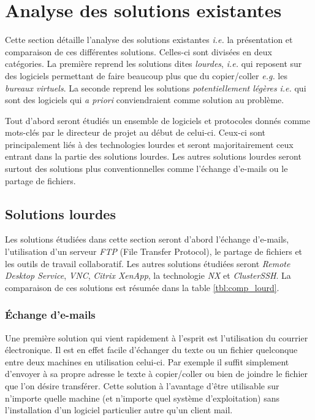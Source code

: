 \chapter{Analyse des solutions existantes}
\renewcommand{\leftmark}{\thechapter.~~Analyse des solutions existantes}
Cette section détaille l'analyse des solutions existantes
\emph{i.e.} la présentation
et comparaison de ces différentes solutions. Celles-ci sont divisées en
deux catégories. La première reprend les solutions dites \emph{lourdes},
\emph{i.e.} qui reposent sur des logiciels permettant de faire
beaucoup plus que du copier/coller \emph{e.g.} les \emph{bureaux virtuels}.
La seconde reprend les solutions \emph{potentiellement légères} \emph{i.e.}
qui sont des logiciels qui \emph{a priori} conviendraient comme solution
au problème.

Tout d'abord seront étudiés un ensemble de logiciels et protocoles
donnés comme mots-clés par le directeur de projet au début de celui-ci.
Ceux-ci sont principalement liés à des technologies lourdes et seront
majoritairement ceux entrant dans la partie des solutions lourdes. Les
autres solutions lourdes seront surtout des solutions plus conventionnelles
comme l'échange d'e-mails ou le partage de fichiers.

\section{Solutions lourdes}
Les solutions étudiées dans cette section seront d'abord l'échange
d'e-mails, l'utilisation d'un serveur \emph{FTP} (File Transfer Protocol),
le partage de fichiers et les outils de travail collaboratif.
Les autres solutions étudiées seront \emph{Remote Desktop Service},
\emph{VNC}, \emph{Citrix XenApp}, la technologie \emph{NX} et
\emph{ClusterSSH}. La comparaison de ces solutions est résumée
dans la table \ref{tbl:comp_lourd}.

\subsection{Échange d'e-mails}
Une première solution qui vient rapidement à l'esprit est l'utilisation
du courrier électronique. Il est en effet facile d'échanger du texte ou
un fichier quelconque entre deux machines en utilisation celui-ci.
Par exemple il suffit simplement d'envoyer à sa propre adresse
le texte à copier/coller ou bien de joindre le fichier que l'on désire
transférer. Cette solution à l'avantage d'être utilisable sur n'importe
quelle machine (et n'importe quel système d'exploitation) sans l'installation
d'un logiciel particulier autre qu'un client mail.

